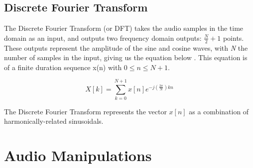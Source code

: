 \subsection{Discrete Fourier Transform}
The Discrete Fourier Transform (or DFT) takes the audio samples in the time domain as an input, and outputs two frequency domain outputs: $\frac{N}{2} + 1$ points. These outputs represent the amplitude of the sine and cosine waves, with \textit{N} the number of samples in the input, giving us the equation below \cite{Gold_Morgan_Ellis_2011}. This equation is of a finite duration sequence x(n)
with $0 \leq n \leq N + 1$.

\begin{equation}\label{eq:dft-equation}
    X[k] = \sum_{k=0}^{N+1}x[n]e^{-j (\frac{2\pi}{N})kn}
\end{equation}

The Discrete Fourier Transform represents the vector $x[n]$ as a combination of harmonically-related sinusoidals. 

\section{Audio Manipulations}